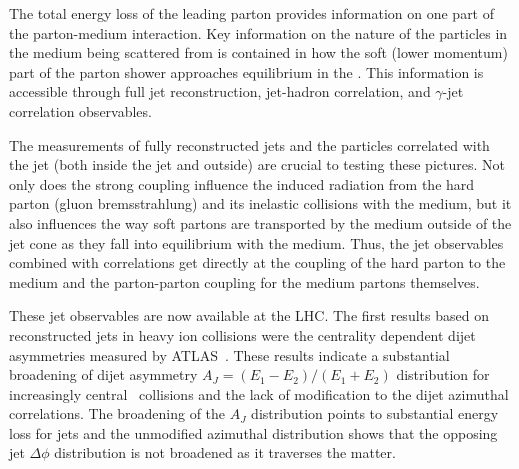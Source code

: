 The total energy loss of the leading parton provides information on
one part of the parton-medium interaction.  Key information on the
nature of the particles in the medium being scattered from is
contained in how the soft (lower momentum) part of the parton shower
approaches equilibrium in the \qgp.  This information is 
accessible through full jet reconstruction, jet-hadron correlation,
and $\gamma$-jet correlation observables. 

The measurements of fully reconstructed jets and the particles correlated
with the jet (both inside the jet and outside) are crucial to testing
these pictures.  Not only does the strong coupling influence the
induced radiation from the hard parton (gluon bremsstrahlung)
and its inelastic collisions with the medium, but it also influences the way
soft partons are transported by the medium outside of the jet cone
as they fall into equilibrium with the medium.  Thus, the jet
observables combined with correlations get directly at the coupling of
the hard parton to the medium and the parton-parton coupling for the
medium partons themselves.

These jet observables are now available at the LHC.  The first results
based on reconstructed jets in heavy ion collisions were the
centrality dependent dijet asymmetries measured by
ATLAS~\cite{Aad:2010bu}. These results
indicate a substantial broadening of
dijet asymmetry $A_{J} = (E_{1}-E_{2})/(E_{1}+E_{2})$ distribution for
increasingly central \PbPb~collisions and the lack of modification to
the dijet azimuthal correlations.  The broadening of the $A_J$
distribution points to substantial energy loss for jets and the
unmodified azimuthal distribution shows that the opposing jet
$\Delta\phi$ distribution is not broadened as it traverses the matter.


